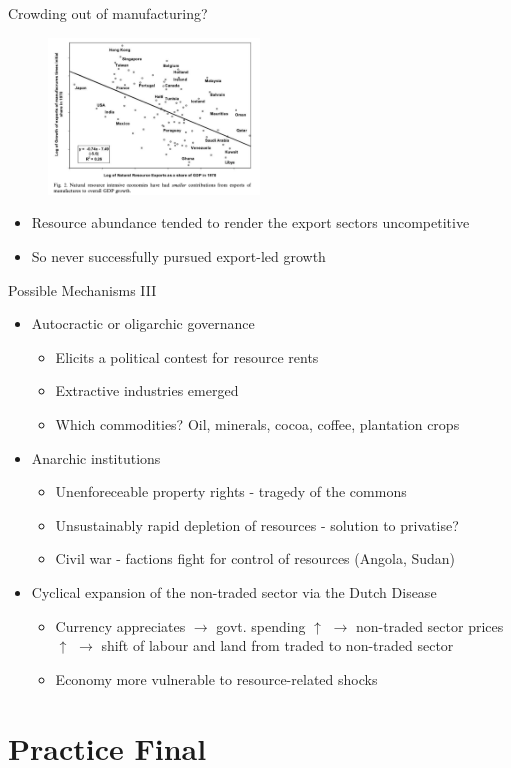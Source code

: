 \documentclass[11pt,notes=hide,aspectratio=169,mathserif]{beamer}
\begin{document}
\begin{frame}{Crowding out of manufacturing?}
\begin{figure}
\centering
\includegraphics[width=0.5\textwidth]{inputs/fig3.png}
\end{figure}
\begin{itemize}
\item Resource abundance tended to render the export sectors uncompetitive
\item So never successfully pursued export-led growth
\end{itemize}
\end{frame}

\begin{frame}{Possible Mechanisms III}
\begin{itemize}
\item Autocractic or oligarchic governance
\begin{itemize}
    \pause \item Elicits a political contest for resource rents
    \pause \item Extractive industries emerged 
    \pause \item Which commodities? Oil, minerals, cocoa, coffee, plantation crops
\end{itemize}
\item Anarchic institutions
\begin{itemize}
    \pause \item Unenforeceable property rights - tragedy of the commons
    \pause \item Unsustainably rapid depletion of resources - solution to privatise?
    \pause \item Civil war - factions fight for control of resources (Angola, Sudan) 
\end{itemize}
\pause \item Cyclical expansion of the non-traded sector via the Dutch Disease
\begin{itemize}
    \pause \item Currency appreciates $\rightarrow$ govt. spending $\uparrow$ $\rightarrow$ non-traded sector prices $\uparrow$ $\rightarrow$ shift of labour and land from traded to non-traded sector
    \pause \item Economy more vulnerable to resource-related shocks
\end{itemize}
\end{itemize}
\end{frame}

\section*{Practice Final}
\end{document}

